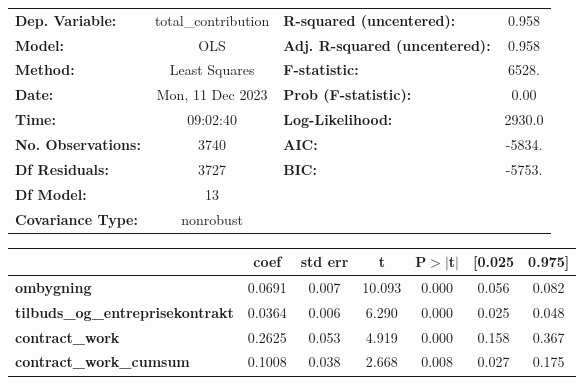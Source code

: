 \begin{center}
\begin{tabular}{lclc}
\toprule
\textbf{Dep. Variable:}                   & total\_contribution & \textbf{  R-squared (uncentered):}      &     0.958   \\
\textbf{Model:}                           &         OLS         & \textbf{  Adj. R-squared (uncentered):} &     0.958   \\
\textbf{Method:}                          &    Least Squares    & \textbf{  F-statistic:       }          &     6528.   \\
\textbf{Date:}                            &   Mon, 11 Dec 2023  & \textbf{  Prob (F-statistic):}          &     0.00    \\
\textbf{Time:}                            &       09:02:40      & \textbf{  Log-Likelihood:    }          &    2930.0   \\
\textbf{No. Observations:}                &          3740       & \textbf{  AIC:               }          &    -5834.   \\
\textbf{Df Residuals:}                    &          3727       & \textbf{  BIC:               }          &    -5753.   \\
\textbf{Df Model:}                        &            13       & \textbf{                     }          &             \\
\textbf{Covariance Type:}                 &      nonrobust      & \textbf{                     }          &             \\
\bottomrule
\end{tabular}
\begin{tabular}{lcccccc}
                                          & \textbf{coef} & \textbf{std err} & \textbf{t} & \textbf{P$> |$t$|$} & \textbf{[0.025} & \textbf{0.975]}  \\
\midrule
\textbf{ombygning}                        &       0.0691  &        0.007     &    10.093  &         0.000        &        0.056    &        0.082     \\
\textbf{tilbuds\_og\_entreprisekontrakt}  &       0.0364  &        0.006     &     6.290  &         0.000        &        0.025    &        0.048     \\
\textbf{contract\_work}                   &       0.2625  &        0.053     &     4.919  &         0.000        &        0.158    &        0.367     \\
\textbf{contract\_work\_cumsum}           &       0.1008  &        0.038     &     2.668  &         0.008        &        0.027    &        0.175     \\

\end{tabular}
\end{center}

